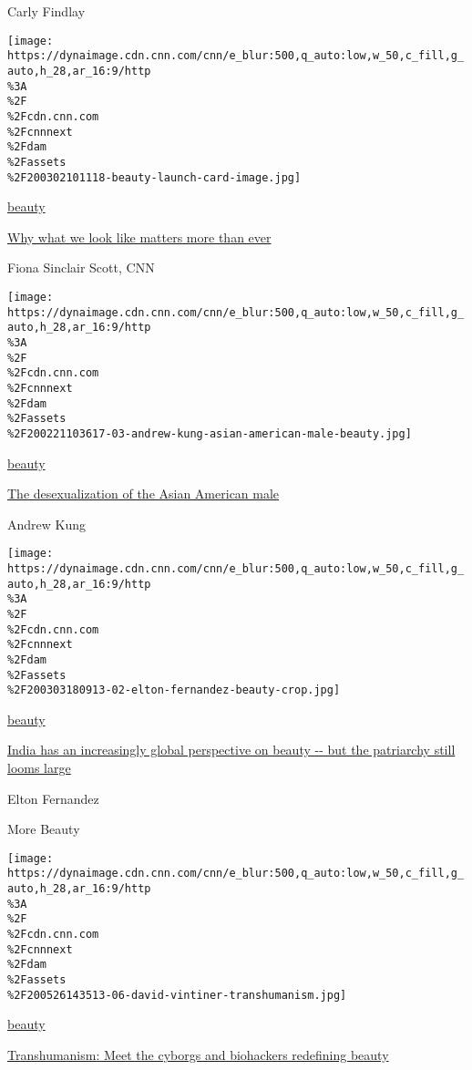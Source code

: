 Carly Findlay

\href{/style/article/cnn-style-beauty-editors-note/index.html}{}

\texttt{[image: https://dynaimage.cdn.cnn.com/cnn/e\_blur:500,q\_auto:low,w\_50,c\_fill,g\_auto,h\_28,ar\_16:9/http\\\%3A\\\%2F\\\%2Fcdn.cnn.com\\\%2Fcnnnext\\\%2Fdam\\\%2Fassets\\\%2F200302101118-beauty-launch-card-image.jpg]}

\href{/style/beauty}{beauty}

\href{/style/article/cnn-style-beauty-editors-note/index.html}{Why what
we look like matters more than ever}

Fiona Sinclair Scott, CNN

\href{/style/article/andrew-kung-asian-american-men/index.html}{}

\texttt{[image: https://dynaimage.cdn.cnn.com/cnn/e\_blur:500,q\_auto:low,w\_50,c\_fill,g\_auto,h\_28,ar\_16:9/http\\\%3A\\\%2F\\\%2Fcdn.cnn.com\\\%2Fcnnnext\\\%2Fdam\\\%2Fassets\\\%2F200221103617-03-andrew-kung-asian-american-male-beauty.jpg]}

\href{/style/beauty}{beauty}

\href{/style/article/andrew-kung-asian-american-men/index.html}{The
desexualization of the Asian American male}

Andrew Kung

\href{/style/article/elton-fernandez-makeup-beauty-opinion/index.html}{}

\texttt{[image: https://dynaimage.cdn.cnn.com/cnn/e\_blur:500,q\_auto:low,w\_50,c\_fill,g\_auto,h\_28,ar\_16:9/http\\\%3A\\\%2F\\\%2Fcdn.cnn.com\\\%2Fcnnnext\\\%2Fdam\\\%2Fassets\\\%2F200303180913-02-elton-fernandez-beauty-crop.jpg]}

\href{/style/beauty}{beauty}

\href{/style/article/elton-fernandez-makeup-beauty-opinion/index.html}{India
has an increasingly global perspective on beauty -\/- but the patriarchy
still looms large}

Elton Fernandez

More Beauty

\href{/style/article/david-vintiner-transhumanism/index.html}{}

\texttt{[image: https://dynaimage.cdn.cnn.com/cnn/e\_blur:500,q\_auto:low,w\_50,c\_fill,g\_auto,h\_28,ar\_16:9/http\\\%3A\\\%2F\\\%2Fcdn.cnn.com\\\%2Fcnnnext\\\%2Fdam\\\%2Fassets\\\%2F200526143513-06-david-vintiner-transhumanism.jpg]}

\href{/style/beauty}{beauty}

\href{/style/article/david-vintiner-transhumanism/index.html}{Transhumanism:
Meet the cyborgs and biohackers redefining beauty}

